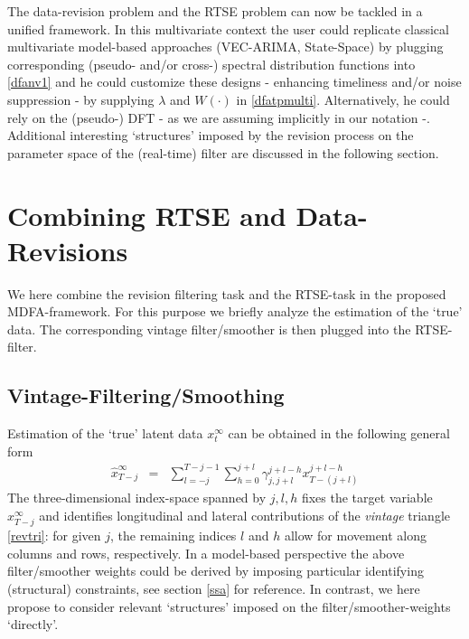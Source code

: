\documentclass[11pt]{article}
\begin{document}
The data-revision problem and the RTSE problem can now be tackled in a unified framework.
In this multivariate context the user could replicate classical multivariate model-based approaches (VEC-ARIMA, State-Space) by plugging corresponding (pseudo- and/or cross-) spectral distribution functions into \ref{dfanv1} and he could customize these designs - enhancing timeliness and/or noise suppression - by supplying $\lambda$ and $W(\cdot)$ in \ref{dfatpmulti}. Alternatively, he could rely on the (pseudo-) DFT - as we are assuming implicitly in our notation -.
Additional interesting `structures' imposed by the revision process on the parameter space of the (real-time) filter are discussed in the following section. 




\section{Combining RTSE and Data-Revisions}\label{reduced}


We here combine the revision filtering task and the RTSE-task in the proposed MDFA-framework. For this purpose we briefly analyze the estimation of the `true' data. The corresponding vintage filter/smoother is then plugged into the RTSE-filter.


\subsection{Vintage-Filtering/Smoothing}\label{structa}

Estimation of the `true' latent data $x_t^{\infty}$ can be obtained in the following general form 
\begin{eqnarray}
\hat{x}_{T-j}^\infty&=&\sum_{l=-j}^{T-j-1}\sum_{h=0}^{j+l} \gamma_{j,j+l}^{j+l-h}x_{T-(j+l)}^{j+l-h}\label{fil}
\end{eqnarray}
The three-dimensional index-space spanned by $j,l,h$ fixes the target variable $x_{T-j}^\infty$ and identifies longitudinal and lateral contributions of the \emph{vintage} triangle \ref{revtri}: for given $j$, the remaining indices $l$ and $h$ allow for movement along columns and rows, respectively. In a model-based perspective the above filter/smoother weights could be derived by imposing particular identifying (structural) constraints, see section \ref{ssa} for reference. In contrast, we here propose to consider relevant `structures' imposed on the filter/smoother-weights `directly'.\\
\end{document}

